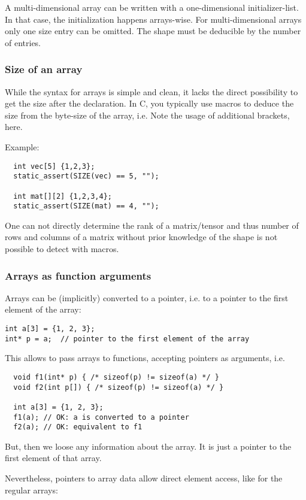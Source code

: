 A multi-dimensional array can be written with a one-dimensional initializer-list. In that case, the initialization happens arrays-wise.
%
%
For multi-dimensional arrays only one size entry can be omitted. The shape must be deducible by the number of entries.


\subsubsection{Size of an array}
While the syntax for arrays is simple and clean, it lacks the direct possibility to get the size after the declaration. In C, you typically
use macros to deduce the size from the byte-size of the array, i.e.
%
%
Note the usage of additional brackets, here.

Example:
\begin{verbatim}
  int vec[5] {1,2,3};
  static_assert(SIZE(vec) == 5, "");

  int mat[][2] {1,2,3,4};
  static_assert(SIZE(mat) == 4, "");
\end{verbatim}

One can not directly determine the rank of a matrix/tensor and thus number of rows and columns of a matrix without prior knowledge of the shape
is not possible to detect with macros.


\subsubsection{Arrays as function arguments}
Arrays can be (implicitly) converted to a pointer, i.e. to a pointer to the first element of the array:
%
\begin{verbatim}
int a[3] = {1, 2, 3};
int* p = a;  // pointer to the first element of the array
\end{verbatim}
%
This allows to pass arrays to functions, accepting pointers as arguments, i.e.
%
\begin{verbatim}
  void f1(int* p) { /* sizeof(p) != sizeof(a) */ }
  void f2(int p[]) { /* sizeof(p) != sizeof(a) */ }

  int a[3] = {1, 2, 3};
  f1(a); // OK: a is converted to a pointer
  f2(a); // OK: equivalent to f1
\end{verbatim}
%
But, then we loose any information about the array. It is just a pointer to the first element of that array.

Nevertheless, pointers to array data allow direct element access, like for the regular arrays:
%


